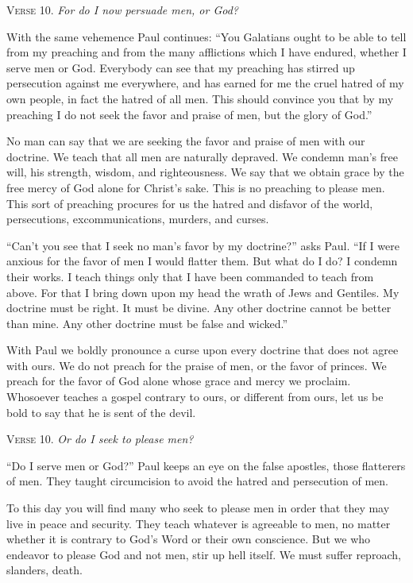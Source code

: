 \textsc{Verse} 10. \emph{For do I now persuade men, or God?}

With the same vehemence Paul continues: “You Galatians ought to be able to tell from my preaching and from the many afflictions which I have endured, whether I serve men or God. Everybody can see that my preaching has stirred up persecution against me everywhere, and has earned for me the cruel hatred of my own people, in fact the hatred of all men. This should convince you that by my preaching I do not seek the favor and praise of men, but the glory of God.”

No man can say that we are seeking the favor and praise of men with our doctrine. We teach that all men are naturally depraved. We condemn man’s free will, his strength, wisdom, and righteousness. We say that we obtain grace by the free mercy of God alone for Christ’s sake. This is no preaching to please men. This sort of preaching procures for us the hatred and disfavor of the world, persecutions, excommunications, murders, and curses.

“Can’t you see that I seek no man’s favor by my doctrine?” asks Paul. “If I were anxious for the favor of men I would flatter them. But what do I do? I condemn their works. I teach things only that I have been commanded to teach from above. For that I bring down upon my head the wrath of Jews and Gentiles. My doctrine must be right. It must be divine. Any other doctrine cannot be better than mine. Any other doctrine must be false and wicked.”

With Paul we boldly pronounce a curse upon every doctrine that does not agree with ours. We do not preach for the praise of men, or the favor of princes. We preach for the favor of God alone whose grace and mercy we proclaim. Whosoever teaches a gospel contrary to ours, or different from ours, let us be bold to say that he is sent of the devil.

\textsc{Verse} 10. \emph{Or do I seek to please men?}

“Do I serve men or God?” Paul keeps an eye on the false apostles, those flatterers of men. They taught circumcision to avoid the hatred and persecution of men.

To this day you will find many who seek to please men in order that they may live in peace and security. They teach whatever is agreeable to men, no matter whether it is contrary to God’s Word or their own conscience. But we who endeavor to please God and not men, stir up hell itself. We must suffer reproach, slanders, death.

